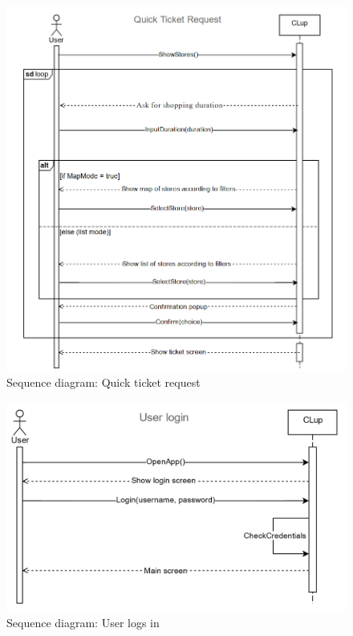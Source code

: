 \begin{figure}[H]
	\includegraphics[width=\linewidth]{../Diagrams/TicketRequest.png}
	\caption{Sequence diagram: Quick ticket request}
	\label{fig:TicketReq}
\end{figure} 

\begin{figure}[H]
	\includegraphics[width=\linewidth]{../Diagrams/UserLogin.png}
	\caption{Sequence diagram: User logs in}
	\label{fig:UserLog}
\end{figure} 

